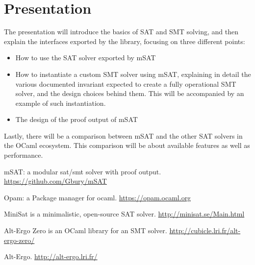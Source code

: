 \documentclass{llncs}
\def\msat{\textsf{mSAT}}
\begin{document}
\section*{Presentation}

The presentation will introduce the basics of SAT and SMT solving, and then
explain the interfaces exported by the library, focusing on three different
points:

\begin{itemize}
  \item How to use the SAT solver exported by \msat{}
  \item How to instantiate a custom SMT solver using \msat{}, explaining in
    detail the various documented invariant expected to create a fully
    operational SMT solver, and the design choices behind them.
    This will be accompanied by an example of such instantiation.
  \item The design of the proof output of \msat{}
\end{itemize}

Lastly, there will be a comparison between \msat{} and the other SAT solvers
in the OCaml ecosystem. This comparison will be about available features
as well as performance.


\begin{thebibliography}{1}

    \msat{}: a modular sat/smt solver with proof output.
    \url{https://github.com/Gbury/mSAT}

    Opam: a Package manager for ocaml.
    \url{https://opam.ocaml.org}

    MiniSat is a minimalistic, open-source SAT solver.
    \url{http://minisat.se/Main.html}

    Alt-Ergo Zero is an OCaml library for an SMT solver.
    \url{http://cubicle.lri.fr/alt-ergo-zero/}

    Alt-Ergo.
    \url{http://alt-ergo.lri.fr/}

\end{thebibliography}
\end{document}
